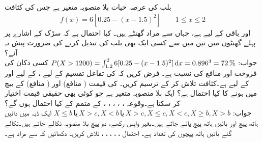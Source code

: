 \quad
بلب کی عرصہ حیات  بلا منصوبہ متغیر ہے جس کی کثافت
\begin{align*}
f(x)=6[0.25-(x-1.5)^2]\quad \quad 1\le x\le 2
\end{align*}
 اور باقی  کے لیے  ہے، جہاں  سے مراد  گھنٹے ہیں۔ کیا احتمال ہے کہ سڑک کے اشارے پر پہلے  گھنٹوں میں تین میں سے کسی ایک بھی بلب کی تبدیل کرنے کی ضرورت پیش نہ آئے؟\\
جواب:\quad
$P(X>1200)=\int_{1.2}^{2}6[0.25-(x-1.5)^2]\dif x=0.896^3=\SI{72}{\percent}$
\quad
کسی دکان کی فروخت اور منافع کی نسبت   ہے۔ فرض کریں کہ  کی تفاعل تقسیم  کے لیے ،  کے لیے  اور  کے لیے  ہے۔کثافت تلاش کر کے ترسیم کریں۔ کی  قیمت  ( منافع) اور  ( منافع) کے بیچ میں ہونے کا کیا احتمال ہے؟  
\quad
{} ایک بلا منصوبہ متغیر ہے جو کوئی بھی حقیقی قیمت اختیار کر سکتا ہے۔وقوعہ ، ، ، ، ،  کے متمم کے کیا احتمال ہوں گے؟\\
جواب:\quad
$X\le b \,\text{یا} \,X>c,X<b \,\text{یا} \, X>c,X\le c,X<c,X\ge b,X>b$
\quad
ایک ڈبہ میں  دائیں ہاتھ پیچ اور  بائیں ہاتھ پیچ پائے جاتے ہیں۔بغیر واپس رکھے، دو پیچ بلا منصوبہ نکالے جاتے ہیں۔نکالے گئے بائیں ہاتھ پیچوں کی تعداد  ہے۔ احتمال ، ،  ، ، ، تلاش کریں۔
\quad
دکھائیں کہ  سے مراد  ہے۔

